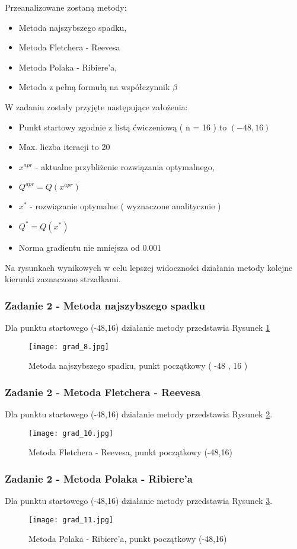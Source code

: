 \documentclass[a4paper,15pt]{article}
\begin{document}
Przeanalizowane zostaną metody:
\begin{itemize}
\item Metoda najszybszego spadku,
\item Metoda Fletchera - Reevesa
\item Metoda Polaka - Ribiere'a,
\item Metoda z pełną formułą na współczynnik \( \beta \)
\end{itemize}
W zadaniu zostały przyjęte następujące założenia:
\begin{itemize}
\item Punkt startowy zgodnie z listą ćwiczeniową ( n = 16 ) to \( (-48,16) \)
\item Max. liczba iteracji to 20
\item \( x^{apr} \) - aktualne przybliżenie rozwiązania optymalnego,
\item \( Q^{apr} = Q(x^{apr}) \)
\item \( x^{*} \) - rozwiązanie optymalne ( wyznaczone analitycznie )
\item \( Q^{*}=Q(x^{*})\)
\item Norma gradientu nie mniejsza od \( 0.001 \) 
\end{itemize}
Na rysunkach wynikowych w celu lepszej widoczności działania metody kolejne kierunki zaznaczono strzałkami.
\newpage
\subsubsection{Zadanie 2 - Metoda najszybszego spadku}
Dla punktu startowego (-48,16) działanie metody przedstawia Rysunek \ref{fig:grad_8}
\begin{figure}[H]
\centerline{\texttt{[image: grad\_8.jpg]}}
\centering
\caption{Metoda najszybszego spadku, punkt początkowy ( -48 , 16 )}
\label{fig:grad_8}
\end{figure}
\subsubsection{Zadanie 2 - Metoda Fletchera - Reevesa }
Dla punktu startowego (-48,16) działanie metody przedstawia Rysunek \ref{fig:grad_10}.
\begin{figure}[H]
\centerline{\texttt{[image: grad\_10.jpg]}}
\centering
\caption{Metoda Fletchera - Reevesa, punkt początkowy (-48,16) }
\label{fig:grad_10}
\end{figure}
\subsubsection{Zadanie 2 - Metoda Polaka - Ribiere'a }
Dla punktu startowego (-48,16) działanie metody przedstawia Rysunek \ref{fig:grad_11}.
\begin{figure}[H]
\centerline{\texttt{[image: grad\_11.jpg]}}
\centering
\caption{Metoda Polaka - Ribiere'a, punkt początkowy (-48,16) }
\label{fig:grad_11}
\end{figure}
\end{document}
